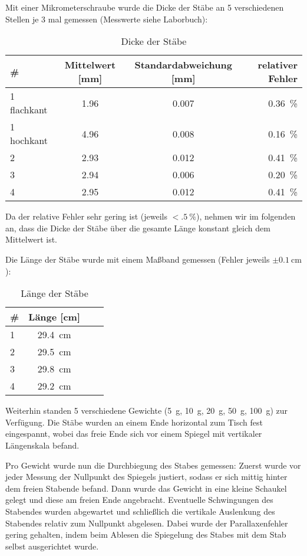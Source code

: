 Mit einer Mikrometerschraube wurde die Dicke der Stäbe an 5 verschiedenen Stellen je 3 mal gemessen (Messwerte siehe Laborbuch):
\begin{table}[H]
  \centering
  \begin{tabular}{l | c | c | r}
    \# & Mittelwert [mm] & Standardabweichung [mm] & relativer Fehler \\ \hline
    1 flachkant & \num{1.96} & \num{0.007} & \SI{.36}{\percent} \\
    1 hochkant & \num{4.96} & \num{0.008} & \SI{.16}{\percent} \\
    2 & \num{2.93} & \num{0.012} & \SI{0.41}{\percent} \\
    3 & \num{2.94} & \num{0.006} & \SI{0.20}{\percent} \\
    4 & \num{2.95} & \num{0.012} & \SI{.41}{\percent}
  \end{tabular}
  \caption{Dicke der Stäbe}
  \label{tab:stabdicke}
\end{table}
Da der relative Fehler sehr gering ist (jeweils $<\SI{.5}{\percent}$), nehmen wir im folgenden an, dass die Dicke der Stäbe über die gesamte Länge konstant gleich dem Mittelwert ist.

Die Länge der Stäbe wurde mit einem Maßband gemessen (Fehler jeweils $\pm \SI{0.1}{\cm}$):
\begin{table}[H]
  \centering
  \begin{tabular}{l | c | c | r}
    \# & Länge [cm] \\ \hline
    1 & \SI{29.4}{\cm} \\
    2 & \SI{29.5}{\cm} \\
    3 & \SI{29.8}{\cm} \\
    4 & \SI{29.2}{\cm}
  \end{tabular}
  \caption{Länge der Stäbe}
  \label{tab:stablänge}
\end{table}

Weiterhin standen 5 verschiedene Gewichte (\SI{5}{g}, \SI{10}{g}, \SI{20}{g}, \SI{50}{g}, \SI{100}{g}) zur Verfügung. Die Stäbe wurden an einem Ende horizontal zum Tisch fest eingespannt, wobei das freie Ende sich vor einem Spiegel mit vertikaler Längenskala befand. 

Pro Gewicht wurde nun die Durchbiegung des Stabes gemessen: Zuerst wurde vor jeder Messung der Nullpunkt des Spiegels justiert, sodass er sich mittig hinter dem freien Stabende befand. Dann wurde das Gewicht in eine kleine Schaukel gelegt und diese am freien Ende angebracht. Eventuelle Schwingungen des Stabendes wurden abgewartet und schließlich die vertikale Auslenkung des Stabendes relativ zum Nullpunkt abgelesen. Dabei wurde der Parallaxenfehler gering gehalten, indem beim Ablesen die Spiegelung des Stabes mit dem Stab selbst ausgerichtet wurde.

